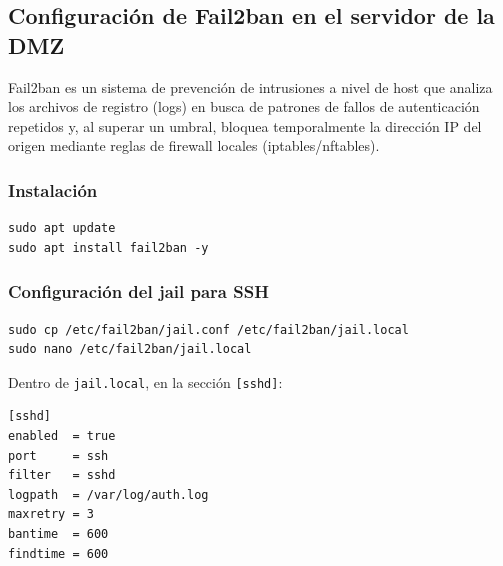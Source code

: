 \documentclass{article}
\renewcommand{\_}{\oldunderscore\hskip0pt\relax}
\begin{document}
\hypertarget{configuraciuxf3n-de-fail2ban-en-el-servidor-de-la-dmz}{%
\subsection{Configuración de Fail2ban en el servidor de la
DMZ}\label{configuraciuxf3n-de-fail2ban-en-el-servidor-de-la-dmz}}

Fail2ban es un sistema de prevención de intrusiones a nivel de host que
analiza los archivos de registro (logs) en busca de patrones de fallos
de autenticación repetidos y, al superar un umbral, bloquea
temporalmente la dirección IP del origen mediante reglas de firewall
locales (iptables/nftables).

\hypertarget{instalaciuxf3n}{%
\subsubsection{Instalación}\label{instalaciuxf3n}}

\begin{Verbatim}[fontsize=\footnotesize,frame=single,rulecolor=\color{codebg},fillcolor=\color{codebg},framesep=2mm,xleftmargin=1mm,xrightmargin=1mm,breaklines=true,breakanywhere=true,breaksymbolleft={},breaksymbolright={}]
sudo apt update
sudo apt install fail2ban -y
\end{Verbatim}

\hypertarget{configuraciuxf3n-del-jail-para-ssh}{%
\subsubsection{Configuración del jail para
SSH}\label{configuraciuxf3n-del-jail-para-ssh}}

\begin{Verbatim}[fontsize=\footnotesize,frame=single,rulecolor=\color{codebg},fillcolor=\color{codebg},framesep=2mm,xleftmargin=1mm,xrightmargin=1mm,breaklines=true,breakanywhere=true,breaksymbolleft={},breaksymbolright={}]
sudo cp /etc/fail2ban/jail.conf /etc/fail2ban/jail.local
sudo nano /etc/fail2ban/jail.local
\end{Verbatim}

Dentro de \texttt{jail.local}, en la sección \texttt{{[}sshd{]}}:

\begin{Verbatim}[fontsize=\footnotesize,frame=single,rulecolor=\color{codebg},fillcolor=\color{codebg},framesep=2mm,xleftmargin=1mm,xrightmargin=1mm,breaklines=true,breakanywhere=true,breaksymbolleft={},breaksymbolright={}]
[sshd]
enabled  = true
port     = ssh
filter   = sshd
logpath  = /var/log/auth.log
maxretry = 3
bantime  = 600
findtime = 600
\end{Verbatim}
\end{document}
